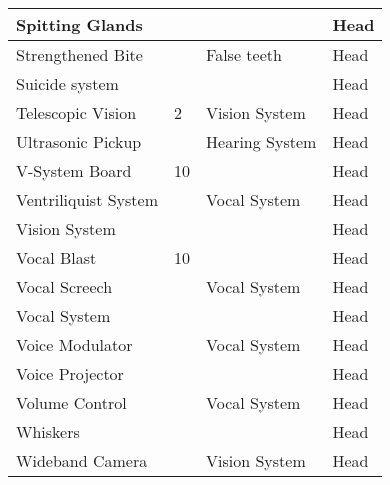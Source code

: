 \documentclass[twoside]{book}
\begin{document}
\begin{longtable}{p{1.25in}p{2em}ll}
  \raggedright
           Spitting Glands 
  &
  
  &
  
  &
   Head 
  \tabularnewline
  \hline
      
  \raggedright
           Strengthened Bite 
  &
  
  &
   False teeth 
  &
   Head 
  \tabularnewline
  \hline
      
  \raggedright
           Suicide system 
  &
  
  &
  
  &
   Head 
  \tabularnewline
  \hline
      
  \raggedright
           Telescopic Vision 
  &
   2 
  &
   Vision System 
  &
   Head 
  \tabularnewline
  \hline
      
  \raggedright
           Ultrasonic Pickup 
  &
  
  &
   Hearing System 
  &
   Head 
  \tabularnewline
  \hline
      
  \raggedright
           V-System Board 
  &
   10 
  &
  
  &
   Head 
  \tabularnewline
  \hline
      
  \raggedright
           Ventriliquist System 
  &
  
  &
   Vocal System 
  &
   Head 
  \tabularnewline
  \hline
      
  \raggedright
           Vision System 
  &
  
  &
  
  &
   Head 
  \tabularnewline
  \hline
      
  \raggedright
           Vocal Blast 
  &
   10 
  &
  
  &
   Head 
  \tabularnewline
  \hline
      
  \raggedright
           Vocal Screech 
  &
  
  &
   Vocal System 
  &
   Head 
  \tabularnewline
  \hline
      
  \raggedright
           Vocal System 
  &
  
  &
  
  &
   Head 
  \tabularnewline
  \hline
      
  \raggedright
           Voice Modulator 
  &
  
  &
   Vocal System 
  &
   Head 
  \tabularnewline
  \hline
      
  \raggedright
           Voice Projector 
  &
  
  &
  
  &
   Head 
  \tabularnewline
  \hline
      
  \raggedright
           Volume Control 
  &
  
  &
   Vocal System 
  &
   Head 
  \tabularnewline
  \hline
      
  \raggedright
           Whiskers 
  &
  
  &
  
  &
   Head 
  \tabularnewline
  \hline
      
  \raggedright
           Wideband Camera 
  &
  
  &
   Vision System 
  &
   Head 
  \tabularnewline
  \hline
      
\end{longtable}
\end{document}
